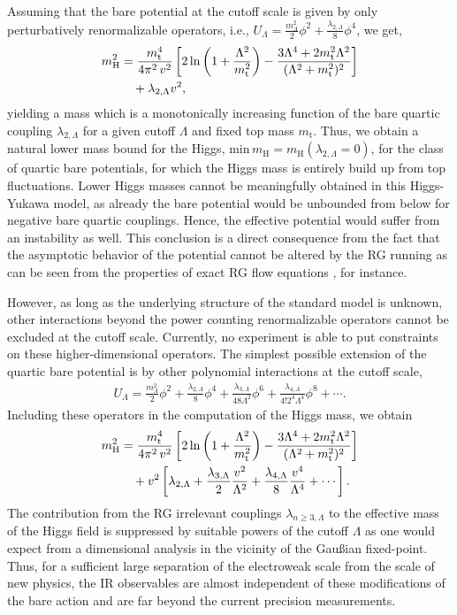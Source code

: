 \documentclass[twocolumn,aps,prd,showpacs,nofootinbib,superscriptaddress,preprintnumbers,floatfix,10pt]{revtex4-1}
\newcommand{\UL}{U_{\Lambda}}
\newcommand{\mL}{m_\Lambda^2}
\newcommand{\lL}{\lambda_{2,\Lambda}}
\newcommand{\mH}{m_{\text{H}}}
\newcommand{\mtop}{m_{\text{t}}}
\begin{document}
Assuming that the bare potential at the cutoff scale is given by only perturbatively renormalizable operators, i.e., $\UL = \frac{\mL}{2}\phi^{2} + \frac{\lL}{8}\phi^{4}$, we get,
%
\begin{align}
 \mH^{2} 
 &= \frac{\mtop^{4}}{4\pi^{2}\, v^{2}} \left[ 2 \ln\left( 1+ \frac{\Lambda^{2}}{\mtop^{2}} \right) - \frac{3\Lambda^{4} + 2\mtop^{2}\Lambda^{2}}{(\Lambda^{2} + \mtop^{2})^{2}} \right]
 \notag \\ &\quad + \lL v^{2},
 \label{eq:HiggsMassQuartic}
\end{align}
%
yielding a mass which is a monotonically increasing function of the bare quartic coupling $\lL$ for a given cutoff $\Lambda$ and fixed top mass $\mtop$. Thus, we obtain a natural lower mass bound for the Higgs, $\mathrm{min}\, \mH = \mH(\lL = 0)$, for the class of quartic bare potentials, for which the Higgs mass is entirely build up from top fluctuations. Lower Higgs masses cannot be meaningfully obtained in this Higgs-Yukawa model, as already the bare potential would be unbounded from below for negative bare quartic couplings. Hence, the effective potential would suffer from an instability as well. 
This conclusion is a direct consequence from the fact that the asymptotic behavior of the potential cannot be altered by the RG running as can be seen from the properties of exact RG flow equations \cite{Wetterich:1992yh}, for instance.


However, as long as the underlying structure of the standard model is unknown, other interactions beyond the power counting renormalizable operators cannot be excluded at the cutoff scale. Currently, no experiment is able to put constraints on these higher-dimensional operators. The simplest possible extension of the quartic bare potential is by other polynomial interactions at the cutoff scale,
%
\begin{align}
\UL = \frac{\mL}{2}\phi^{2} + \frac{\lL}{8} \phi^{4} + \frac{\lambda_{3,\Lambda}}{48 \Lambda^{2}} \phi^{6} + \frac{\lambda_{4,\Lambda}}{4!2^{4} \Lambda^{4}} \phi^{8} + \cdots.
\label{eq:BarePotPoly}
\end{align}
%
Including these operators in the computation of the Higgs mass, we obtain
%
\begin{align}
 \mH^{2} 
 &= \frac{\mtop^{4}}{4\pi^{2}\, v^{2}} \left[ 2 \ln\left( 1+ \frac{\Lambda^{2}}{\mtop^{2}} \right) - \frac{3\Lambda^{4} + 2\mtop^{2}\Lambda^{2}}{(\Lambda^{2} + \mtop^{2})^{2}} \right] \notag \\ 
&\quad + v^{2} \left[ \lL +  \frac{\lambda_{3,\Lambda}}{2}\frac{v^{2}}{\Lambda^{2}} + \frac{\lambda_{4,\Lambda}}{8}\frac{v^{4}}{\Lambda^{4}} + \cdots \right].
\label{eq:HiggsMassPoly}
\end{align}
%
The contribution from the RG irrelevant couplings $\lambda_{n\geq 3,\Lambda}$ to the effective mass of the Higgs field is suppressed by suitable powers of the cutoff $\Lambda$ as one would expect from a dimensional analysis in the vicinity of the Gau{\ss}ian fixed-point. Thus, for a sufficient large separation of the electroweak scale from the scale of new physics, the IR observables are almost independent of these modifications of the bare action and are far beyond the current precision measurements.
\end{document}
